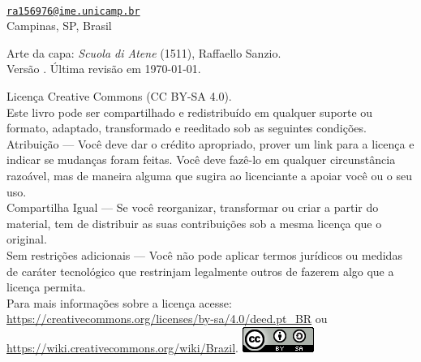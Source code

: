 \thispagestyle{empty}

\noindent
\autor \\
\href{mailto:ra156976@ime.unicamp.br}{\texttt{ra156976@ime.unicamp.br}}\\
Campinas, SP, Brasil

\vfill

\noindent Arte da capa: \textit{Scuola di Atene} (1511), Raffaello Sanzio.
\vspace*{0.5cm}\\
Versão \versao. Última revisão em \today.
\vspace*{0.5cm}\\
\begin{small}
\noindent
\ccLogo{} Licença Creative Commons (CC BY-SA 4.0).\\
Este livro pode ser compartilhado e redistribuído em qualquer suporte ou formato, adaptado, transformado e reeditado sob as seguintes condições.\\
Atribuição --- Você deve dar o crédito apropriado, prover um link para a licença e indicar se mudanças foram feitas. Você deve fazê-lo em qualquer circunstância razoável, mas de maneira alguma que sugira ao licenciante a apoiar você ou o seu uso.\\
Compartilha Igual --- Se você reorganizar, transformar ou criar a partir do material, tem de distribuir as suas contribuições sob a mesma licença que o original.\\
Sem restrições adicionais --- Você não pode aplicar termos jurídicos ou medidas de caráter tecnológico que restrinjam legalmente outros de fazerem algo que a licença permita.\\
Para mais informações sobre a licença acesse:\\
\url{https://creativecommons.org/licenses/by-sa/4.0/deed.pt_BR} ou\\
\url{https://wiki.creativecommons.org/wiki/Brazil}. \hfill
\includegraphics[height=\baselineskip]{./imagens/licenca.png}
\end{small}
